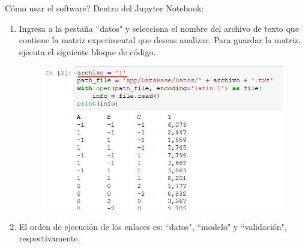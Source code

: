 \begin{frame}[t]{C\'omo usar el software?}\vspace{0pt}
Dentro del Jupyter Notebook:
\begin{enumerate}
	\item  Ingresa a la pesta\~na ``datos" y selecciona el nombre del archivo de texto que contiene la matriz experimental que deseas analizar. Para guardar la matriz, ejecuta el siguiente bloque de c\'odigo.
	\begin{figure}
		\includegraphics[scale=0.55]{Images/data.png}
	\end{figure}
	\item El orden de ejecuci\'on de los enlaces es: ``datos", ``modelo" y ``validaci\'on", respectivamente.
\end{enumerate}
\end{frame}